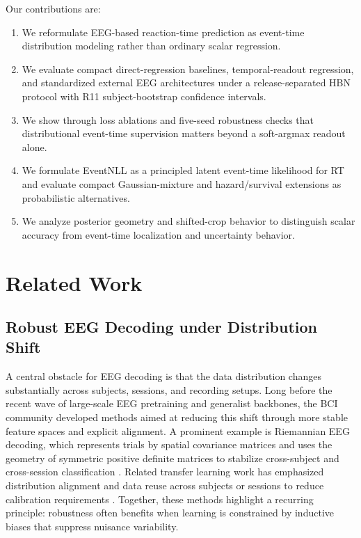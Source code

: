 \documentclass[12pt]{article}
\begin{document}
Our contributions are:
\begin{enumerate}
    \item We reformulate EEG-based reaction-time prediction as event-time distribution modeling rather than ordinary scalar regression.
    \item We evaluate compact direct-regression baselines, temporal-readout regression, and standardized external EEG architectures under a release-separated HBN protocol with R11 subject-bootstrap confidence intervals.
    \item We show through loss ablations and five-seed robustness checks that distributional event-time supervision matters beyond a soft-argmax readout alone.
    \item We formulate EventNLL as a principled latent event-time likelihood for RT and evaluate compact Gaussian-mixture and hazard/survival extensions as probabilistic alternatives.
    \item We analyze posterior geometry and shifted-crop behavior to distinguish scalar accuracy from event-time localization and uncertainty behavior.
\end{enumerate}

\section{Related Work}

\subsection{Robust EEG Decoding under Distribution Shift}
A central obstacle for EEG decoding is that the data distribution changes substantially
across subjects, sessions, and recording setups. Long before the recent wave of large-scale EEG
pretraining and generalist backbones, the BCI community developed methods aimed at reducing this
shift through more stable feature spaces and explicit alignment. A prominent example is
Riemannian EEG decoding, which represents trials by spatial covariance matrices and
uses the geometry of symmetric positive definite matrices to stabilize cross-subject and
cross-session classification \citep{Barachant2012RiemannianBCI}. Related transfer
learning work has emphasized distribution alignment and data reuse across subjects or
sessions to reduce calibration requirements
\citep{Jayaram2016TransferLearningBCI,Zanini2018RiemannianTL,HeWu2020EuclideanAlignment}.
Together, these methods highlight a recurring principle: robustness often benefits when
learning is constrained by inductive biases that suppress nuisance variability.
\end{document}
